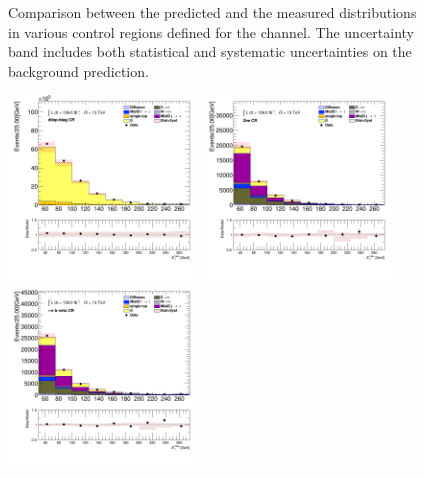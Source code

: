 \begin{figure}[!thp]
\begin{center}
			\end{center}
			\caption{
			Comparison between the predicted and the measured \Etm distributions in various control regions defined for the \taujets channel. The uncertainty band includes both statistical and systematic uncertainties on the background prediction. 
			}
			\label{fig:bkg-met-taujets}
		\end{figure}

		\begin{figure}[!thp]
			\begin{center}    
			\includegraphics[width=0.45\textwidth]{chapters/chapter6_HPlus/images/taulep/met_et_DILEP_BTAG.png}
			\includegraphics[width=0.45\textwidth]{chapters/chapter6_HPlus/images/taulep/met_et_ZEE.png} \\
			\includegraphics[width=0.45\textwidth]{chapters/chapter6_HPlus/images/taulep/met_et_TAUEL_BVETO.png} 

\end{center}
\end{figure}
